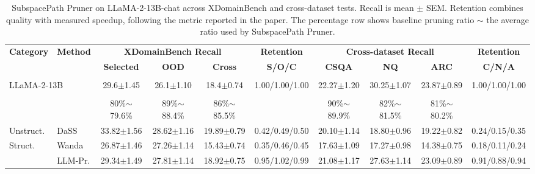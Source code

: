 \documentclass[12pt,a4paper]{article}
\newcommand{\method}[1]{{\sffamily\bfseries\color{MethodBlue}#1}}
\newcommand{\XDB}{\method{XDomainBench}}
\newcommand{\SubspacePath}{\method{SubspacePath Pruner}}
\def\method#1{#1}\def\XDB{XDomainBench}\def\SubspacePath{SubspacePath Pruner}%
\begin{document}
\begin{table}[t]
\centering\singlespacing
\caption{\SubspacePath{} on LLaMA-2-13B-chat across XDomainBench and cross-dataset tests. Recall is mean $\pm$ SEM. Retention combines quality with measured speedup, following the metric reported in the paper. The percentage row shows baseline pruning ratio $\sim$ the average ratio used by \SubspacePath{}.}
\label{tab:sp-main}
\setlength{\tabcolsep}{2.2pt}
\renewcommand{\arraystretch}{1.02}
\begin{adjustbox}{max width=\textwidth}
\begin{tabular}{llccc c ccc c}
\toprule
\textbf{Category} & \textbf{Method} &
\multicolumn{3}{c}{\textbf{XDomainBench Recall}} & \textbf{Retention} &
\multicolumn{3}{c}{\textbf{Cross-dataset Recall}} & \textbf{Retention}\\
\cmidrule(lr){3-5}\cmidrule(lr){6-6}\cmidrule(lr){7-9}\cmidrule(l){10-10}
&& \textbf{Selected} & \textbf{OOD} & \textbf{Cross} & \textbf{S/O/C} &
\textbf{CSQA} & \textbf{NQ} & \textbf{ARC} & \textbf{C/N/A}\\
\midrule
\rowcolor{SoftGray}\multicolumn{10}{c}{\textbf{Dense model}}\\
\multicolumn{2}{l}{LLaMA-2-13B} &
29.6{\scriptsize$\pm$1.45} & 26.1{\scriptsize$\pm$1.10} & 18.4{\scriptsize$\pm$0.74} &
1.00/1.00/1.00 &
22.27{\scriptsize$\pm$1.20} & 30.25{\scriptsize$\pm$1.07} & 23.87{\scriptsize$\pm$0.89} &
1.00/1.00/1.00\\
\midrule
\rowcolor{SoftGray}\multicolumn{10}{c}{\textbf{Moderate pruning}}\\
\rowcolor{SoftGray}&&
80\%$\sim$79.6\% & 89\%$\sim$88.4\% & 86\%$\sim$85.5\% && 
90\%$\sim$89.9\% & 82\%$\sim$81.5\% & 81\%$\sim$80.2\% &\\
\multirow{1}{*}{Unstruct.} & DaSS &
33.82{\scriptsize$\pm$1.56} & 28.62{\scriptsize$\pm$1.16} & 19.89{\scriptsize$\pm$0.79} &
0.42/0.49/0.50 &
20.10{\scriptsize$\pm$1.14} & 18.80{\scriptsize$\pm$0.96} & 19.22{\scriptsize$\pm$0.82} &
0.24/0.15/0.35\\
\multirow{2}{*}{Struct.} & Wanda &
26.87{\scriptsize$\pm$1.46} & 27.26{\scriptsize$\pm$1.14} & 15.43{\scriptsize$\pm$0.74} &
0.35/0.46/0.45 &
17.63{\scriptsize$\pm$1.09} & 17.27{\scriptsize$\pm$0.98} & 14.38{\scriptsize$\pm$0.75} &
0.18/0.11/0.24\\
& LLM-Pr. &
29.34{\scriptsize$\pm$1.49} & 27.81{\scriptsize$\pm$1.14} & 18.92{\scriptsize$\pm$0.75} &
0.95/1.02/0.99 &
21.08{\scriptsize$\pm$1.17} & 27.63{\scriptsize$\pm$1.14} & 23.09{\scriptsize$\pm$0.89} &
0.91/0.88/0.94\\

\end{tabular}
\end{adjustbox}
\end{table}
\end{document}
